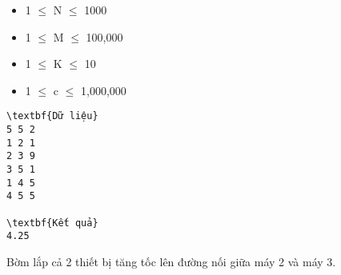 \begin{itemize}
	\item     1  $\le$  N  $\le$  1000   
	\item     1  $\le$  M  $\le$  100,000   
	\item     1  $\le$  K  $\le$  10   
	\item     1  $\le$  c  $\le$  1,000,000   
\end{itemize}
\begin{verbatim}
\textbf{Dữ liệu}
5 5 2
1 2 1
2 3 9
3 5 1
1 4 5
4 5 5

\textbf{Kết quả}
4.25
\end{verbatim}
Bờm lắp cả 2 thiết bị tăng tốc lên đường nối giữa máy 2 và máy 3.